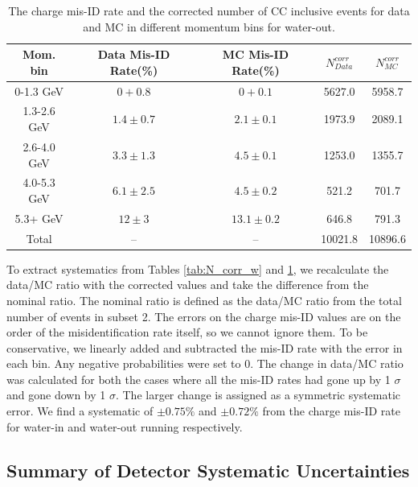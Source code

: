 \begin{table}
\caption{The charge mis-ID rate and the corrected number of CC inclusive events for data and MC in different momentum bins for water-out.}
\label{tab:N_corr_a}
\centering
\begin{tabular}{ccccc}\toprule
Mom. bin & Data Mis-ID Rate(\%) & MC Mis-ID Rate(\%) & $N^{corr}_{Data}$ & $N^{corr}_{MC}$ \\\midrule
0-1.3 GeV & $0+0.8$ & $0+0.1$ & 5627.0 & 5958.7 \\
1.3-2.6 GeV & $1.4\pm 0.7$ & $2.1\pm 0.1$  & 1973.9 & 2089.1 \\
2.6-4.0 GeV & $3.3\pm 1.3$ & $4.5\pm 0.1$ & 1253.0 & 1355.7 \\
4.0-5.3 GeV & $6.1\pm 2.5$ & $4.5\pm 0.2$ & 521.2 & 701.7 \\
5.3+ GeV & $12\pm 3$ & $13.1\pm 0.2$  & 646.8 & 791.3 \\\midrule
Total & --  & --  &10021.8 & 10896.6\\
\bottomrule
\end{tabular}
\end{table}

To extract systematics from Tables \ref{tab:N_corr_w} and \ref{tab:N_corr_a}, we recalculate the data/MC ratio with the corrected values and take the difference from the nominal ratio. The nominal ratio is defined as the data/MC ratio from the total number of events in subset 2. %
The errors on the charge mis-ID values are on the order of the misidentification rate itself, so we cannot ignore them. To be conservative, we linearly added and subtracted the mis-ID rate with the error in each bin. Any negative probabilities were set to 0. The change in data/MC ratio was calculated for both the cases where all the mis-ID rates had gone up by 1 $\sigma$ and gone down by 1 $\sigma$. The larger change is assigned as a symmetric systematic error. We find a systematic of $\pm 0.75\% $ and $\pm 0.72\%$ from the charge mis-ID rate for water-in and water-out running respectively.

\subsection{Summary of Detector Systematic Uncertainties}


